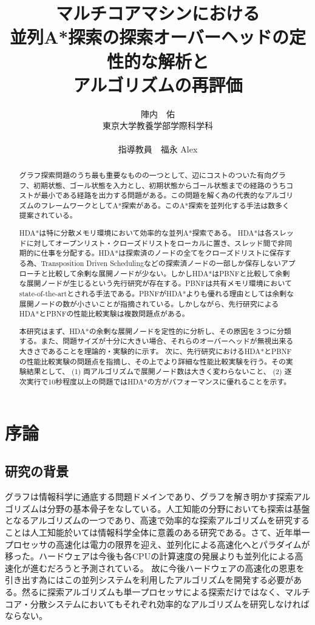 \documentclass{jsarticle}
\title{マルチコアマシンにおける\\
並列A*探索の探索オーバーヘッドの定性的な解析と\\
アルゴリズムの再評価}
\author{陣内　佑 \\
東京大学教養学部学際科学科\\
\\
指導教員　福永 Alex}
\begin{document}
\maketitle

\begin{abstract}
グラフ探索問題のうち最も重要なものの一つとして、辺にコストのついた有向グラフ、初期状態、ゴール状態を入力とし、初期状態からゴール状態までの経路のうちコストが最小である経路を出力する問題がある。この問題を解く為の代表的なアルゴリズムのフレームワークとしてA*探索がある。このA*探索を並列化する手法は数多く提案されている。

HDA*は特に分散メモリ環境において効率的な並列A*探索である。
HDA*は各スレッドに対してオープンリスト・クローズドリストをローカルに置き、スレッド間で非同期的に仕事を分配する。HDA*は探索済のノードの全てをクローズドリストに保存する為、Transposition Driven Schedulingなどの探索済ノードの一部しか保存しないアプローチと比較して余剰な展開ノードが少ない。しかしHDA*はPBNFと比較して余剰な展開ノードが生じるという先行研究が存在する。PBNFは共有メモリ環境においてstate-of-the-artとされる手法である。PBNFがHDA*よりも優れる理由としては余剰な展開ノードの数が小さいことが指摘されている。しかしながら、先行研究によるHDA*とPBNFの性能比較実験は複数問題点がある。

本研究はまず、HDA*の余剰な展開ノードを定性的に分析し、その原因を３つに分類する。また、問題サイズが十分に大きい場合、それらのオーバーヘッドが無視出来る大きさであることを理論的・実験的に示す。
次に、先行研究におけるHDA*とPBNFの性能比較実験の問題点を指摘し、その上でより詳細な性能比較実験を行う。その実験結果として、 (1) 両アルゴリズムで展開ノード数は大きく変わらないこと、 (2) 逐次実行で10秒程度以上の問題ではHDA*の方がパフォーマンスに優れることを示す。
\end{abstract}

\newpage
\tableofcontents
\newpage

\section{序論}

\subsection{研究の背景}
グラフは情報科学に通底する問題ドメインであり、グラフを解き明かす探索アルゴリズムは分野の基本骨子をなしている。人工知能の分野においても探索は基盤となるアルゴリズムの一つであり、高速で効率的な探索アルゴリズムを研究することは人工知能於いては情報科学全体に意義のある研究である。さて、近年単一プロセッサの高速化は電力の限界を迎え、並列化による高速化へとパラダイムが移った。ハードウェアは今後も各CPUの計算速度の発展よりも並列化による高速化が進むだろうと予測されている。%
故に今後ハードウェアの高速化の恩恵を引き出す為にはこの並列システムを利用したアルゴリズムを開発する必要がある。然るに探索アルゴリズムも単一プロセッサによる探索だけではなく、マルチコア・分散システムにおいてもそれぞれ効率的なアルゴリズムを研究しなければならない。
\end{document}
